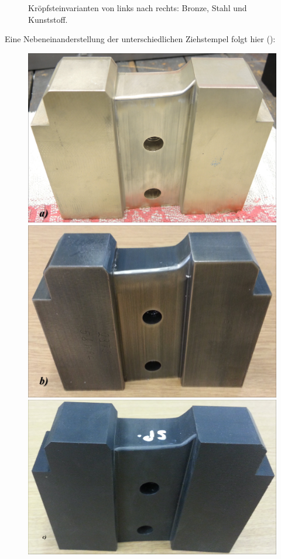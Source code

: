 \documentclass[12pt,a4paper,parskip,twoside,BCOR5mm,headsepline]{scrartcl}
\begin{document}
\begin{description*}
\begin{figure}[H]
\begin{minipage} [t]{0.3115\textwidth}
\end{minipage}
\caption{Kröpfsteinvarianten von links nach rechts: Bronze, Stahl und Kunststoff.}
\label{fig:dievar}
\end{figure}


Eine Nebeneinanderstellung der unterschiedlichen Ziehstempel folgt hier (): 


\begin{figure}[H]
\centering
\begin{minipage}[t]{0.3\textwidth}
\includegraphics[width=.9\textwidth]{punchbronze}
\end{minipage}
\begin{minipage}[t]{0.3\textwidth}
\includegraphics[width=.9\textwidth]{punchstahl}
\end{minipage}
\begin{minipage} [t]{0.329\textwidth}
\includegraphics[width=.9\textwidth]{punchkunst}


\end{minipage}
\end{figure}
\end{description*}
\end{document}
